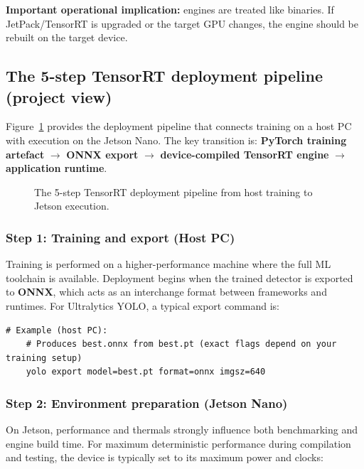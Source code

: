 \noindent
\textbf{Important operational implication:} engines are treated like binaries. If JetPack/TensorRT is upgraded or the target GPU changes, the engine should be rebuilt on the target device.

\subsection{The 5-step TensorRT deployment pipeline (project view)}
\label{sec:tensorrt_5step_pipeline}

\noindent
Figure~\ref{fig:tensorrt_5step_pipeline} provides the deployment pipeline that connects training on a host PC with execution on the Jetson Nano.
The key transition is: \textbf{PyTorch training artefact} $\rightarrow$ \textbf{ONNX export} $\rightarrow$ \textbf{device-compiled TensorRT engine} $\rightarrow$ \textbf{application runtime}.

\begin{figure}[htbp]
	\centering
	
	\caption{The 5-step TensorRT deployment pipeline from host training to Jetson execution.}
	\label{fig:tensorrt_5step_pipeline}
\end{figure}

\subsubsection*{Step 1: Training and export (Host PC)}
\noindent
Training is performed on a higher-performance machine where the full ML toolchain is available.
Deployment begins when the trained detector is exported to \textbf{ONNX}, which acts as an interchange format between frameworks and runtimes.
For Ultralytics YOLO, a typical export command is:

\begin{lstlisting}[language=MyBash,style=bashstyle,caption={Example: export YOLOv8 checkpoint to ONNX (host PC)},label={lst:yolo_export_onnx}]
	# Example (host PC):
	# Produces best.onnx from best.pt (exact flags depend on your training setup)
	yolo export model=best.pt format=onnx imgsz=640
\end{lstlisting}

\subsubsection*{Step 2: Environment preparation (Jetson Nano)}
\noindent
On Jetson, performance and thermals strongly influence both benchmarking and engine build time.
For maximum deterministic performance during compilation and testing, the device is typically set to its maximum power and clocks:

